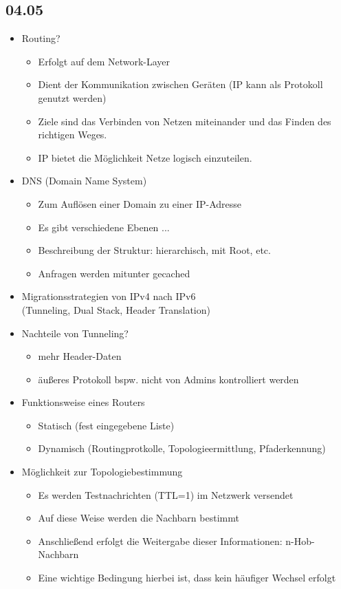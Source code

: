 \documentclass{article} %
\begin{document}
\subsection{04.05}
	\begin{itemize}
		\item Routing?
		\begin{itemize}
			\item Erfolgt auf dem Network-Layer
			\item Dient der Kommunikation zwischen Geräten (IP kann als Protokoll genutzt werden)
			\item Ziele sind das Verbinden von Netzen miteinander und das Finden des richtigen Weges.
			\item IP bietet die Möglichkeit Netze logisch einzuteilen.
		\end{itemize}
		\item DNS (Domain Name System)
		\begin{itemize}
			\item Zum Auflösen einer Domain zu einer IP-Adresse
			\item Es gibt verschiedene Ebenen ...
			\item Beschreibung der Struktur: hierarchisch, mit Root, etc.
			\item Anfragen werden mitunter gecached
		\end{itemize}
		\item Migrationsstrategien von IPv4 nach IPv6\\
		(Tunneling, Dual Stack, Header Translation)
		\item Nachteile von Tunneling?
			\begin{itemize}
				\item mehr Header-Daten
				\item äußeres Protokoll bspw. nicht von Admins kontrolliert werden
			\end{itemize}
		\item Funktionsweise eines Routers
		\begin{itemize}
			\item Statisch (fest eingegebene Liste)
			\item Dynamisch (Routingprotkolle, Topologieermittlung, Pfaderkennung)
		\end{itemize}
		\item Möglichkeit zur Topologiebestimmung
		\begin{itemize}
			\item Es werden Testnachrichten (TTL=1) im Netzwerk versendet
			\item Auf diese Weise werden die Nachbarn bestimmt
			\item Anschließend erfolgt die Weitergabe dieser Informationen: n-Hob-Nachbarn
			\item Eine wichtige Bedingung hierbei ist, dass kein häufiger Wechsel erfolgt
		\end{itemize}
	\end{itemize}
\end{document}
